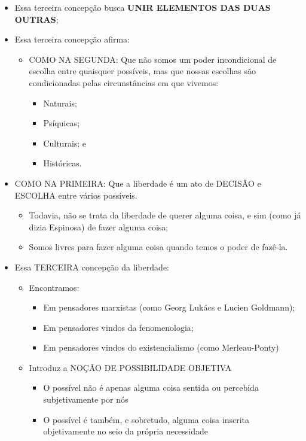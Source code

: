 \documentclass[
]{book}
\providecommand{\tightlist}{%
  \setlength{\itemsep}{0pt}\setlength{\parskip}{0pt}}
\begin{document}
\begin{itemize}
\tightlist
\item
  Essa terceira concepção busca \textbf{UNIR ELEMENTOS DAS DUAS OUTRAS};
\item
  Essa terceira concepção afirma:

  \begin{itemize}
  \tightlist
  \item
    COMO NA SEGUNDA: Que não somos um poder incondicional de escolha entre quaisquer possíveis, mas que nossas escolhas são condicionadas pelas circunstâncias em que vivemos:

    \begin{itemize}
    \tightlist
    \item
      Naturais;
    \item
      Psíquicas;
    \item
      Culturais; e
    \item
      Históricas.
    \end{itemize}
  \end{itemize}
\item
  COMO NA PRIMEIRA: Que a liberdade é um ato de DECISÃO e ESCOLHA entre vários possíveis.

  \begin{itemize}
  \tightlist
  \item
    Todavia, não se trata da liberdade de querer alguma coisa, e sim (como já dizia Espinosa) de fazer alguma coisa;
  \item
    Somos livres para fazer alguma coisa quando temos o poder de fazê-la.
  \end{itemize}
\item
  Essa TERCEIRA concepção da liberdade:

  \begin{itemize}
  \tightlist
  \item
    Encontramos:

    \begin{itemize}
    \tightlist
    \item
      Em pensadores marxistas (como Georg Lukács e Lucien Goldmann);
    \item
      Em pensadores vindos da fenomenologia;
    \item
      Em pensadores vindos do existencialismo (como Merleau-Ponty)
    \end{itemize}
  \item
    Introduz a NOÇÃO DE POSSIBILIDADE OBJETIVA

    \begin{itemize}
    \tightlist
    \item
      O possível não é apenas alguma coisa sentida ou percebida subjetivamente por nós
    \item
      O possível é também, e sobretudo, alguma coisa inscrita objetivamente no seio da própria necessidade


\end{itemize}
\end{itemize}
\end{itemize}
\end{document}
